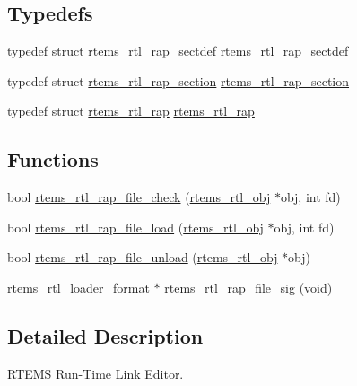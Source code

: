 \subsection*{Typedefs}
\begin{DoxyCompactItemize}
\item 
typedef struct \mbox{\hyperlink{structrtems__rtl__rap__sectdef}{rtems\+\_\+rtl\+\_\+rap\+\_\+sectdef}} \mbox{\hyperlink{rtl-rap_8c_a992ba7a2f73c7000ec31705f805d1996}{rtems\+\_\+rtl\+\_\+rap\+\_\+sectdef}}
\item 
typedef struct \mbox{\hyperlink{structrtems__rtl__rap__section}{rtems\+\_\+rtl\+\_\+rap\+\_\+section}} \mbox{\hyperlink{rtl-rap_8c_a50343088766a6a267bf105074d0d485b}{rtems\+\_\+rtl\+\_\+rap\+\_\+section}}
\item 
typedef struct \mbox{\hyperlink{structrtems__rtl__rap}{rtems\+\_\+rtl\+\_\+rap}} \mbox{\hyperlink{rtl-rap_8c_a5d329f3fbdcc98def5cc0dd025812d77}{rtems\+\_\+rtl\+\_\+rap}}
\end{DoxyCompactItemize}
\subsection*{Functions}
\begin{DoxyCompactItemize}
\item 
bool \mbox{\hyperlink{rtl-rap_8c_a1c969535841d803fd98b4b8f518daf79}{rtems\+\_\+rtl\+\_\+rap\+\_\+file\+\_\+check}} (\mbox{\hyperlink{structrtems__rtl__obj}{rtems\+\_\+rtl\+\_\+obj}} $\ast$obj, int fd)
\item 
bool \mbox{\hyperlink{rtl-rap_8c_a0ce5487461c31a98e4ddda966ad7fad9}{rtems\+\_\+rtl\+\_\+rap\+\_\+file\+\_\+load}} (\mbox{\hyperlink{structrtems__rtl__obj}{rtems\+\_\+rtl\+\_\+obj}} $\ast$obj, int fd)
\item 
bool \mbox{\hyperlink{rtl-rap_8c_ab14c07dd22f90a014ff7e192015cf1c4}{rtems\+\_\+rtl\+\_\+rap\+\_\+file\+\_\+unload}} (\mbox{\hyperlink{structrtems__rtl__obj}{rtems\+\_\+rtl\+\_\+obj}} $\ast$obj)
\item 
\mbox{\hyperlink{structrtems__rtl__loader__format}{rtems\+\_\+rtl\+\_\+loader\+\_\+format}} $\ast$ \mbox{\hyperlink{rtl-rap_8c_a0ba92ca2206cf08da6e0ead2563ae1fd}{rtems\+\_\+rtl\+\_\+rap\+\_\+file\+\_\+sig}} (void)
\end{DoxyCompactItemize}


\subsection{Detailed Description}
R\+T\+E\+MS Run-\/\+Time Link Editor. 

